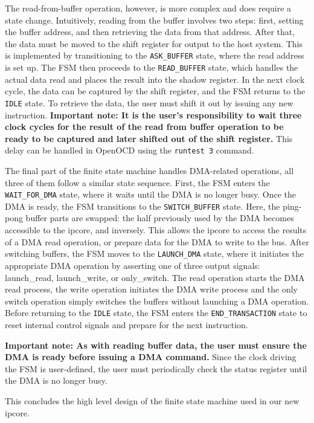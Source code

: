 \documentclass[a4paper,11pt,oneside]{report}
\begin{document}
The read-from-buffer operation, however, is more complex and does require a state change.
Intuitively, reading from the buffer involves two steps:
first, setting the buffer address, and then retrieving the data from that address.
After that, the data must be moved to the shift register for output to the host system.
This is implemented by transitioning to the \texttt{ASK\_BUFFER} state, where the read address is set up.
The FSM then proceeds to the \texttt{READ\_BUFFER} state, which handles the actual data read
and places the result into the shadow register.
In the next clock cycle, the data can be captured by the shift register, and the FSM returns to the \texttt{IDLE} state.
To retrieve the data, the user must shift it out by issuing any new instruction.
\textbf{Important note: It is the user's responsibility to wait three clock cycles for the result of the read from buffer operation
to be ready to be captured and later shifted out of the shift register.} This delay can be handled in OpenOCD using the \texttt{runtest 3} command.

The final part of the finite state machine handles DMA-related operations,
all three of them follow a similar state sequence.
First, the FSM enters the \texttt{WAIT\_FOR\_DMA} state, where it waits until the DMA is no longer busy.
Once the DMA is ready, the FSM transitions to the \texttt{SWITCH\_BUFFER} state.
Here, the ping-pong buffer parts are swapped: the half previously used by the DMA
becomes accessible to the ipcore, and inversely.
This allows the ipcore to access the results of a DMA read operation,
or prepare data for the DMA to write to the bus.
After switching buffers, the FSM moves to the \texttt{LAUNCH\_DMA} state,
where it initiates the appropriate DMA operation by asserting one of three output signals:
launch\_read, launch\_write, or only\_switch.
The read operation starts the DMA read process, the write operation
initiates the DMA write process and the only switch operation simply switches the buffers without launching a DMA operation.
Before returning to the \texttt{IDLE} state, the FSM enters the \texttt{END\_TRANSACTION} state
to reset internal control signals and prepare for the next instruction.

\textbf{Important note: As with reading buffer data, the user must ensure the DMA is ready before issuing a DMA command.}
Since the clock driving the FSM is user-defined, the user must periodically check the status register
until the DMA is no longer busy.

This concludes the high level design of the finite state machine used in our new ipcore.
\end{document}
